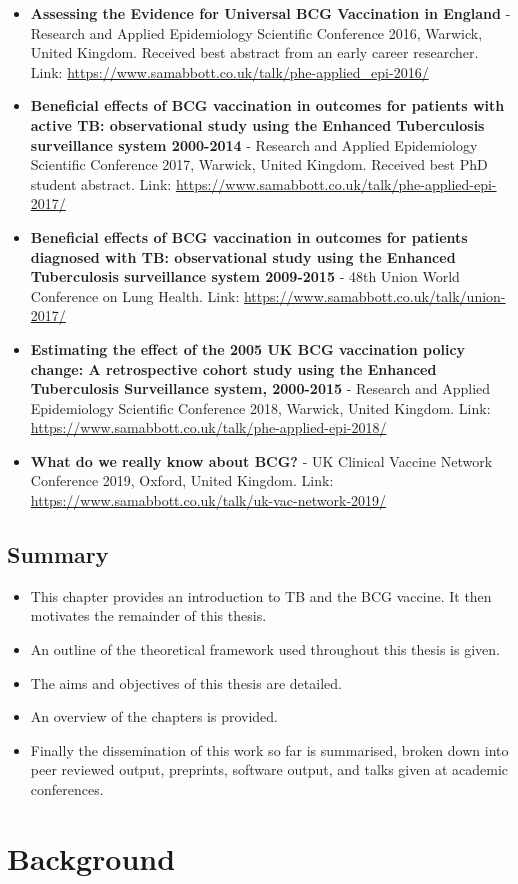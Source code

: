 \documentclass[11pt,twoside]{bristolthesis}
\providecommand{\tightlist}{%
  \setlength{\itemsep}{0pt}\setlength{\parskip}{0pt}}
\begin{document}
  \begin{itemize}
  \item
    \textbf{Assessing the Evidence for Universal BCG Vaccination in England} - Research and Applied Epidemiology Scientific Conference 2016, Warwick, United Kingdom. Received best abstract from an early career researcher. Link: \url{https://www.samabbott.co.uk/talk/phe-applied_epi-2016/}
  \item
    \textbf{Beneficial effects of BCG vaccination in outcomes for patients with active TB: observational study using the Enhanced Tuberculosis surveillance system 2000-2014} - Research and Applied Epidemiology Scientific Conference 2017, Warwick, United Kingdom. Received best PhD student abstract. Link: \url{https://www.samabbott.co.uk/talk/phe-applied-epi-2017/}
  \item
    \textbf{Beneficial effects of BCG vaccination in outcomes for patients diagnosed with TB: observational study using the Enhanced Tuberculosis surveillance system 2009-2015} - 48th Union World Conference on Lung Health. Link: \url{https://www.samabbott.co.uk/talk/union-2017/}
  \item
    \textbf{Estimating the effect of the 2005 UK BCG vaccination policy change: A retrospective cohort study using the Enhanced Tuberculosis Surveillance system, 2000-2015} - Research and Applied Epidemiology Scientific Conference 2018, Warwick, United Kingdom. Link: \url{https://www.samabbott.co.uk/talk/phe-applied-epi-2018/}
  \item
    \textbf{What do we really know about BCG?} - UK Clinical Vaccine Network Conference 2019, Oxford, United Kingdom. Link: \url{https://www.samabbott.co.uk/talk/uk-vac-network-2019/}
  \end{itemize}
  \hypertarget{summary}{%
  \section{Summary}\label{summary}}
  \begin{itemize}
  \tightlist
  \item
    This chapter provides an introduction to TB and the BCG vaccine. It then motivates the remainder of this thesis.
  \item
    An outline of the theoretical framework used throughout this thesis is given.
  \item
    The aims and objectives of this thesis are detailed.
  \item
    An overview of the chapters is provided.
  \item
    Finally the dissemination of this work so far is summarised, broken down into peer reviewed output, preprints, software output, and talks given at academic conferences.
  \end{itemize}
  \hypertarget{background}{%
  \chapter{Background}\label{background}}
  
\end{document}

